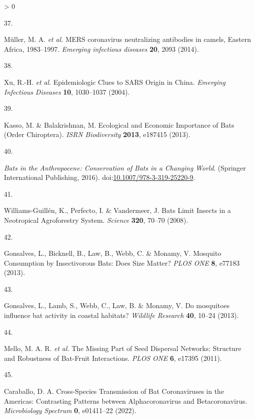 \documentclass[10pt,oneside]{article}
\newlength{\cslhangindent}
\newlength{\csllabelwidth}
\newenvironment{CSLReferences}[3] %
 {%
  \setlength{\parindent}{0pt}
  \ifodd #1 \everypar{\setlength{\hangindent}{\cslhangindent}}\ignorespaces\fi
  \ifnum #2 > 0
  \setlength{\parskip}{#2\baselineskip}
  \fi
 }%
 {}
\newcommand{\CSLLeftMargin}[1]{\parbox[t]{\maxof{\widthof{#1}}{\csllabelwidth}}{#1}}
\newcommand{\CSLRightInline}[1]{\parbox[t]{\linewidth}{#1}}
\begin{document}
\begin{CSLReferences}{0}{0}
\leavevmode\hypertarget{ref-Muller2014Mers}{}%
\CSLLeftMargin{37. }
\CSLRightInline{Müller, M. A. \emph{et al.} MERS coronavirus
neutralizing antibodies in camels, Eastern Africa, 1983--1997.
\emph{Emerging infectious diseases} \textbf{20}, 2093 (2014).}

\leavevmode\hypertarget{ref-Xu2004Epidemiologic}{}%
\CSLLeftMargin{38. }
\CSLRightInline{Xu, R.-H. \emph{et al.} Epidemiologic Clues to SARS
Origin in China. \emph{Emerging Infectious Diseases} \textbf{10},
1030--1037 (2004).}

\leavevmode\hypertarget{ref-Kasso2013Ecological}{}%
\CSLLeftMargin{39. }
\CSLRightInline{Kasso, M. \& Balakrishnan, M. Ecological and Economic
Importance of Bats (Order Chiroptera). \emph{ISRN Biodiversity}
\textbf{2013}, e187415 (2013).}

\leavevmode\hypertarget{ref-Voigt2016Bats}{}%
\CSLLeftMargin{40. }
\CSLRightInline{\emph{Bats in the Anthropocene: Conservation of Bats in
a Changing World}. (Springer International Publishing, 2016).
doi:\href{https://doi.org/10.1007/978-3-319-25220-9}{10.1007/978-3-319-25220-9}.}

\leavevmode\hypertarget{ref-Williams-Guillen2008Bats}{}%
\CSLLeftMargin{41. }
\CSLRightInline{Williams-Guillén, K., Perfecto, I. \& Vandermeer, J.
Bats Limit Insects in a Neotropical Agroforestry System. \emph{Science}
\textbf{320}, 70--70 (2008).}

\leavevmode\hypertarget{ref-Gonsalves2013Mosquito}{}%
\CSLLeftMargin{42. }
\CSLRightInline{Gonsalves, L., Bicknell, B., Law, B., Webb, C. \&
Monamy, V. Mosquito Consumption by Insectivorous Bats: Does Size Matter?
\emph{PLOS ONE} \textbf{8}, e77183 (2013).}

\leavevmode\hypertarget{ref-Gonsalves2013Mosquitoes}{}%
\CSLLeftMargin{43. }
\CSLRightInline{Gonsalves, L., Lamb, S., Webb, C., Law, B. \& Monamy, V.
Do mosquitoes influence bat activity in coastal habitats? \emph{Wildlife
Research} \textbf{40}, 10--24 (2013).}

\leavevmode\hypertarget{ref-Mello2011Missing}{}%
\CSLLeftMargin{44. }
\CSLRightInline{Mello, M. A. R. \emph{et al.} The Missing Part of Seed
Dispersal Networks: Structure and Robustness of Bat-Fruit Interactions.
\emph{PLOS ONE} \textbf{6}, e17395 (2011).}

\leavevmode\hypertarget{ref-Caraballo2022Crossspecies}{}%
\CSLLeftMargin{45. }
\CSLRightInline{Caraballo, D. A. Cross-Species Transmission of Bat
Coronaviruses in the Americas: Contrasting Patterns between
Alphacoronavirus and Betacoronavirus. \emph{Microbiology Spectrum}
\textbf{0}, e01411--22 (2022).}


\end{CSLReferences}
\end{document}
